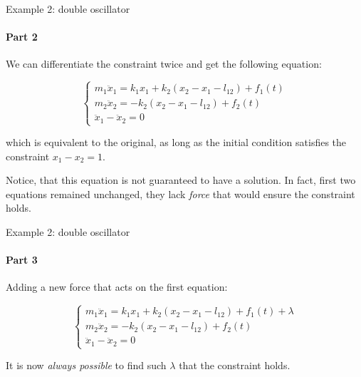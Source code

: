 \documentclass{beamer}
\begin{document}
\begin{frame}{Example 2: double oscillator}
\framesubtitle{Part 2}
\begin{flushleft}

We can differentiate the constraint twice and get the following equation:

\begin{equation}
\begin{cases}
    m_1 \ddot x_1 = k_1 x_1 + k_2 (x_2 - x_1 - l_{12}) + f_1 (t) \\
    m_2 \ddot x_2 = -k_2 (x_2 - x_1 - l_{12}) + f_2 (t) \\
    \ddot x_1 - \ddot x_2 = 0
\end{cases}
\end{equation}

which is equivalent to the original, as long as the initial condition satisfies the constraint $x_1 - x_2 = 1$. 

\bigskip

Notice, that this equation is not guaranteed to have a solution. In fact, first two equations remained unchanged, they lack \emph{force} that would ensure the constraint holds. 

\end{flushleft}
\end{frame}



\begin{frame}{Example 2: double oscillator}
\framesubtitle{Part 3}
\begin{flushleft}

Adding a new force that acts on the first equation:

\begin{equation}
\begin{cases}
    m_1 \ddot x_1 = k_1 x_1 + k_2 (x_2 - x_1 - l_{12}) + f_1 (t) + \lambda \\
    m_2 \ddot x_2 = -k_2 (x_2 - x_1 - l_{12}) + f_2 (t) \\
    \ddot x_1 - \ddot x_2 = 0
\end{cases}
\end{equation}

It is now \emph{always possible} to find such $\lambda$ that the constraint holds.

\end{flushleft}
\end{frame}
\end{document}
